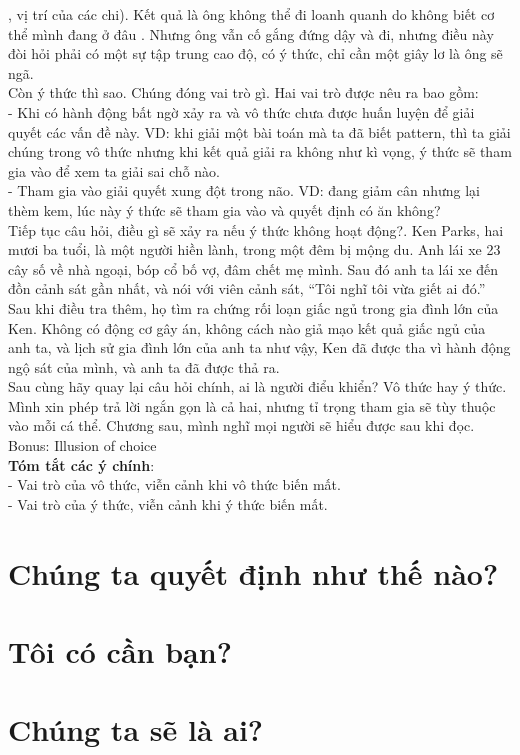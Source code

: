 \documentclass{article}
\newcommand\tab[1][1cm]{\hspace*{#1}}
\begin{document}
, vị trí của các chi). Kết quả là ông không thể đi loanh quanh do không biết cơ thể mình đang ở đâu
. Nhưng ông vẫn cố gắng đứng dậy và đi, nhưng điều này đòi hỏi phải có một sự tập trung cao độ, 
có ý thức, chỉ cần một giây lơ là ông sẽ ngã.\\
\tab Còn ý thức thì sao. Chúng đóng vai trò gì. Hai vai trò được nêu ra bao gồm:\\
\tab - Khi có hành động bất ngờ xảy ra và vô thức chưa được huấn luyện để giải quyết các vấn đề này.
VD: khi giải một bài toán mà ta đã biết pattern, thì ta giải chúng trong vô thức nhưng khi kết quả 
giải ra không như kì vọng, ý thức sẽ tham gia vào để xem ta giải sai chỗ nào.\\
\tab - Tham gia vào giải quyết xung đột trong não. VD: đang giảm cân nhưng lại thèm kem, lúc này ý
thức sẽ tham gia vào và quyết định có ăn không?\\
\tab Tiếp tục câu hỏi, điều gì sẽ xảy ra nếu ý thức không hoạt động?. Ken Parks, hai mươi ba tuổi, 
là một người hiền lành, trong một đêm bị mộng du. Anh lái xe 23 cây số về nhà ngoại, bóp cổ bố vợ,
đâm chết mẹ mình. Sau đó anh ta lái xe đến đồn cảnh sát gần nhất, và nói với viên cảnh sát, “Tôi nghĩ tôi
vừa giết ai đó.” Sau khi điều tra thêm, họ tìm ra chứng rối loạn giấc ngủ trong gia đình lớn của Ken. 
Không có động cơ gây án, không cách nào giả mạo kết quả giấc ngủ của anh ta, và lịch sử gia đình lớn của 
anh ta như vậy, Ken đã được tha vì hành động ngộ sát của mình, và anh ta đã được thả ra.\\
\tab Sau cùng hãy quay lại câu hỏi chính, ai là người điểu khiển? Vô thức hay ý thức. Mình xin phép trả lời
ngắn gọn là cả hai, nhưng tỉ trọng tham gia sẽ tùy thuộc vào mỗi cá thể. Chương sau, mình nghĩ mọi người sẽ 
hiểu được sau khi đọc.\\
\tab Bonus: Illusion of choice\\
\tab \textbf{Tóm tắt các ý chính}: \\
\tab - Vai trò của vô thức, viễn cảnh khi vô thức biến mất.\\
\tab - Vai trò của ý thức, viễn cảnh khi ý thức biến mất.\\

\section{Chúng ta quyết định như thế nào?}
\section{Tôi có cần bạn?}
\section{Chúng ta sẽ là ai?}
\end{document}
